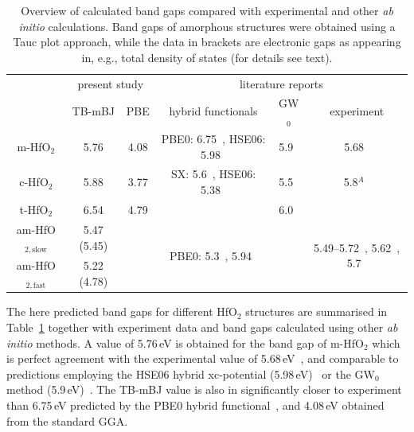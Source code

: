 \documentclass[10pt,a4paper,twocolumn]{article}
\begin{document}
\begin{table}
\begin{center}

\caption{Overview of calculated band gaps compared with experimental and other \textit{ab initio} calculations. Band gaps of amorphous structures were obtained using a Tauc plot approach, while the data in brackets are electronic gaps as appearing in, e.g., total density of states (for details see text).}
\label{gaps}

\begin{tabular}{c|cc|ccc}
& \multicolumn{2}{c|}{present study} & \multicolumn{3}{c}{literature reports}\\
			& TB-mBJ  & PBE & hybrid functionals & GW$_0$ & experiment \\
\hline
m-HfO$_2$ &	5.76 & 4.08 & PBE0: 6.75~\cite{Komsa2010}, HSE06: 5.98~\cite{Komsa2010} & 5.9~\cite{Gruning2010} & 5.68~\cite{Balog1977} \\
c-HfO$_2$ &	5.88 & 3.77 & SX: 5.6~\cite{Clark2010}, HSE06: 5.38~\cite{Yang2014} & 5.5~\cite{Gruning2010} & 5.8$^A$~\cite{Lim2002}\\
t-HfO$_2$ &	6.54 & 4.79 &  & 6.0~\cite{Gruning2010} & \\
am-HfO$_{2,\mathrm{slow}}$ & 5.47 (5.45) & & \multirow{2}{*}{PBE0: 5.3~\cite{Broqvist2007}, 5.94~\cite{Chen2011}} &  & \multirow{2}{*}{5.49--5.72~\cite{Takeuchi2004}, 5.62~\cite{Nguyen2005}, 5.7~\cite{Perevalov2007}}\\
am-HfO$_{2,\mathrm{fast}}$ & 5.22 (4.78) & &  &  & \\

\end{tabular}
\end{center}
\end{table}

The here predicted band gaps for different HfO$_2$ structures are summarised in Table~\ref{gaps} together with experiment data and band gaps calculated using other \textit{ab initio} methods.
A value of 5.76\,eV is obtained for the band gap of m-HfO$_2$ which is perfect agreement with the experimental value of 5.68\,eV~\cite{Balog1977}, and comparable to predictions employing the HSE06 hybrid xc-potential (5.98\,eV)~\cite{Komsa2010} or the GW$_0$ method (5.9\,eV)~\cite{Gruning2010}.
The TB-mBJ value is also in significantly closer to experiment than 6.75\,eV predicted by the PBE0 hybrid functional~\cite{Komsa2010}, and 4.08\,eV obtained from the standard GGA.
\end{document}
